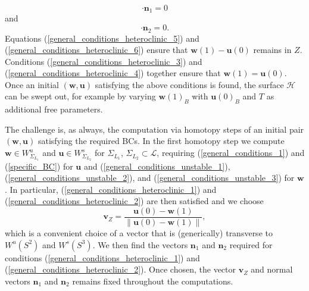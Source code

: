 \documentclass{ws-ijbc}
\begin{document}
\begin{equation}
	[\mathbf{u}(0) - \mathbf{w}(1)] \cdot \mathbf{n}_1 =0
	\label{general_conditions_heteroclinic_5}
\end{equation}
and
\begin{equation}	
	 [\mathbf{u}(0) - \mathbf{w}(1)] \cdot \mathbf{n}_2 =0.
	 \label{general_conditions_heteroclinic_6}
\end{equation}
Equations (\ref{general_conditions_heteroclinic_5}) and (\ref{general_conditions_heteroclinic_6}) ensure that $\mathbf{w}(1)-\mathbf{u}(0)$ remains in $Z$.  Conditions (\ref{general_conditions_heteroclinic_3}) and (\ref{general_conditions_heteroclinic_4}) together ensure that $\mathbf{w}(1) = \mathbf{u}(0)$.  Once an initial $(\mathbf{w}, \mathbf{u})$ satisfying the above conditions is found, the surface $\mathscr{H}$ can be swept out, for example by varying $\mathbf{w}(1)_B$ with $\mathbf{u}(0)_B$ and $T$ as additional free parameters.  

The challenge is, as always, the computation via homotopy steps of an initial pair $(\mathbf{w}, \mathbf{u})$ satisfying the required BCs.  In the first homotopy step we compute $\mathbf{w} \in W^u_{\Sigma_{L_1}}$ and $\mathbf{u} \in W^s_{\Sigma_{L_2}}$ for $\Sigma_{L_1} $, $\Sigma_{L_2} \subset \mathscr{L}$, requiring (\ref{general_conditions_1}) and (\ref{specific_BC}) for $\mathbf{u}$ and (\ref{general_conditions_unstable_1}), (\ref{general_conditions_unstable_2}), and (\ref{general_conditions_unstable_3}) for $\mathbf{w}$.  In particular, (\ref{general_conditions_heteroclinic_1}) and (\ref{general_conditions_heteroclinic_2}) are then satisfied and we choose
	\begin{equation*}
		\mathbf{v}_Z = \frac{\mathbf{u}(0) - \mathbf{w}(1)}{\left\lVert \mathbf{u}(0) - \mathbf{w}(1) \right\lVert},
		\label{Lin_vector}
	\end{equation*}
which is a convenient choice of a vector that is (generically) transverse to $W^u(S^2)$ and $W^s(S^3)$. We then find the vectors $\mathbf{n}_1$ and $\mathbf{n}_2$ required for conditions (\ref{general_conditions_heteroclinic_1}) and  (\ref{general_conditions_heteroclinic_2}). Once chosen, the vector $\mathbf{v}_Z$ and normal vectors $\mathbf{n}_1$ and $\mathbf{n}_2$ remains fixed throughout the computations.
\end{document}

